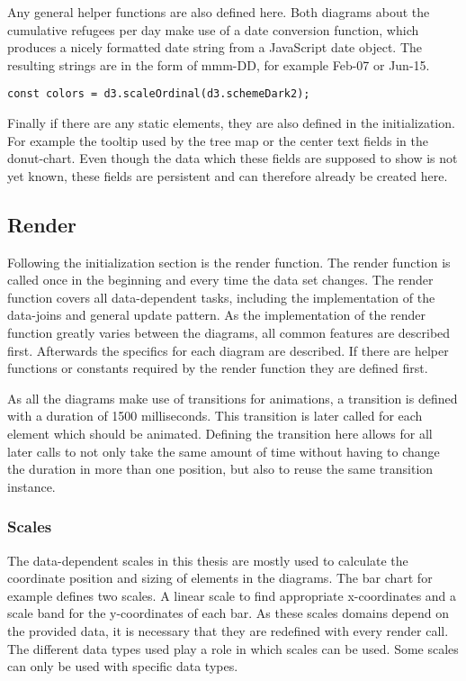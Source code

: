 Any general helper functions are also defined here. Both diagrams about the cumulative refugees per day make use of a date conversion function, which produces a nicely formatted date string from a JavaScript date object. The resulting strings are in the form of mmm-DD, for example Feb-07 or Jun-15.

\begin{minipage}{0.9\linewidth}
    \begin{lstlisting}[style=htmlCSSjs, captionpos=b, caption={Definition of the data independent color scale. \texttt{d3.schemeDarkv2} is a predefined list of color values which is to be used by the scale.}, label={color_scale}]
const colors = d3.scaleOrdinal(d3.schemeDark2);
    \end{lstlisting}
\end{minipage}

Finally if there are any static elements, they are also defined in the initialization. For example the tooltip used by the tree map or the center text fields in the donut-chart. Even though the data which these fields are supposed to show is not yet known, these fields are persistent and can therefore already be created here.

\subsection{Render}
Following the initialization section is the render function. The render function is called once in the beginning and every time the data set changes. The render function covers all data-dependent tasks, including the implementation of the data-joins and general update pattern. As the implementation of the render function greatly varies between the diagrams, all common features are described first. Afterwards the specifics for each diagram are described. If there are helper functions or constants required by the render function they are defined first. 

As all the diagrams make use of transitions for animations, a transition is defined with a duration of 1500 milliseconds. This transition is later called for each element which should be animated. Defining the transition here allows for all later calls to not only take the same amount of time without having to change the duration in more than one position, but also to reuse the same transition instance.

\subsubsection{Scales}
The data-dependent scales in this thesis are mostly used to calculate the coordinate position and sizing of elements in the diagrams. The bar chart for example defines two scales. A linear scale to find appropriate x-coordinates and a scale band for the y-coordinates of each bar. As these scales domains depend on the provided data, it is necessary that they are redefined with every render call.
The different data types used play a role in which scales can be used. Some scales can only be used with specific data types.

